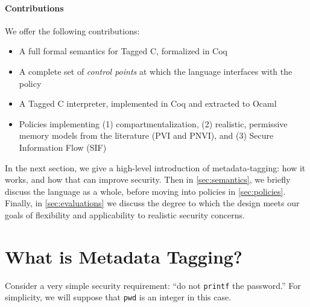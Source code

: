 \documentclass{llncs}
\begin{document}

\paragraph{Contributions}

We offer the following contributions:

\begin{itemize}
\item A full formal semantics for Tagged C, formalized in Coq
\item A complete set of {\em control points} at which the language interfaces with the policy
\item A Tagged C interpreter, implemented in Coq and extracted to Ocaml
\item Policies implementing (1) compartmentalization,
  (2) realistic, permissive memory models from the literature (PVI and PNVI),
  and (3) Secure Information Flow (SIF)
\end{itemize}

In the next section, we give a high-level introduction of metadata-tagging: how it works,
and how that can improve security. Then in \cref{sec:semantics}, we briefly discuss the
language as a whole, before moving into policies in \cref{sec:policies}. Finally, in
\cref{sec:evaluations} we discuss the degree to
which the design meets our goals of flexibility and applicability to realistic
security concerns.

\section{What is Metadata Tagging?}

  
Consider a very simple security requirement: ``do not {\tt printf} the password.''
For simplicity, we will suppose that {\tt pwd} is an integer in this case.
\end{document}
